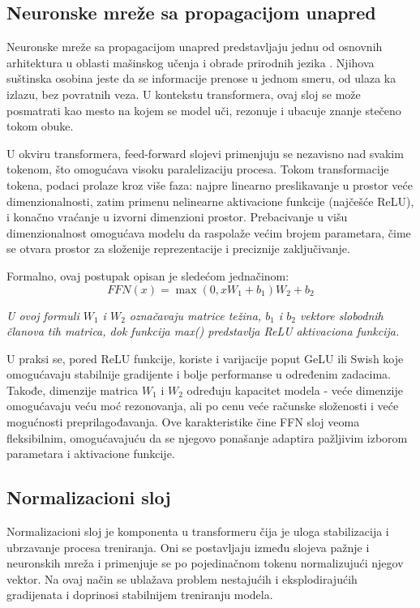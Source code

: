 \documentclass[12pt,oneside]{memoir}
\begin{document}
\subsection{Neuronske mreže sa propagacijom unapred}

Neuronske mreže sa propagacijom unapred predstavljaju jednu od osnovnih arhitektura u oblasti mašinskog učenja i obrade prirodnih jezika \cite{FFN}. Njihova suštinska osobina jeste da se informacije prenose u jednom smeru, od ulaza ka izlazu, bez povratnih veza. U kontekstu transformera, ovaj sloj se može posmatrati kao mesto na kojem se model uči, rezonuje i ubacuje znanje stečeno tokom obuke.  

U okviru transformera, feed-forward slojevi primenjuju se nezavisno nad svakim tokenom, što omogućava visoku paralelizaciju procesa. Tokom transformacije tokena, podaci prolaze kroz više faza: najpre linearno preslikavanje u prostor veće dimenzionalnosti, zatim primenu nelinearne aktivacione funkcije (najčešće ReLU), i konačno vraćanje u izvorni dimenzioni prostor. Prebacivanje u višu dimenzionalnost omogućava modelu da raspolaže većim brojem parametara, čime se otvara prostor za složenije reprezentacije i preciznije zaključivanje.  

Formalno, ovaj postupak opisan je sledećom jednačinom:
\begin{equation}
	FFN(x) = \max(0, xW_{1} + b_{1})W_{2} + b_{2}
\end{equation}

\textit{U ovoj formuli \(W_{1}\) i \(W_{2}\) označavaju matrice težina, \(b_{1}\) i \(b_{2}\) vektore slobodnih članova tih matrica, dok funkcija max() predstavlja ReLU\cite{ReLU} aktivaciona funkcija.}

U praksi se, pored ReLU funkcije, koriste i varijacije poput GeLU\cite{GeLU} ili Swish\cite{Swish} koje omogućavaju stabilnije gradijente i bolje performanse u određenim zadacima. Takođe, dimenzije matrica \(W_1\) i \(W_2\) određuju kapacitet modela - veće dimenzije omogućavaju veću moć rezonovanja, ali po cenu veće računske složenosti i veće mogućnosti preprilagođavanja. Ove karakteristike čine FFN sloj veoma fleksibilnim, omogućavajuću da se njegovo ponašanje adaptira pažljivim izborom parametara i aktivacione funkcije.

\subsection { Normalizacioni sloj }

Normalizacioni sloj je komponenta u transformeru čija je uloga stabilizacija i ubrzavanje procesa treniranja. Oni se postavljaju između slojeva pažnje i neuronskih mreža i primenjuje se po pojedinačnom tokenu normalizujući njegov vektor. Na ovaj način se ublažava problem nestajućih i eksplodirajućih gradijenata i doprinosi stabilnijem treniranju modela.
\end{document}
